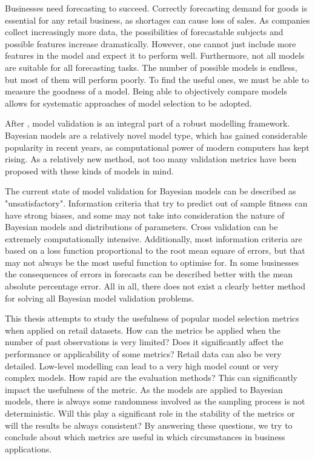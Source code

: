\documentclass[english, 12pt, a4paper, sci, utf8, a-1b, online]{aaltothesis}
\begin{document}




Businesses need forecasting to succeed. Correctly forecasting demand for goods is essential for any retail business, as shortages can cause loss of sales. As companies collect increasingly more data, the possibilities of forecastable subjects and possible features increase dramatically. However, one cannot just include more features in the model and expect it to perform well. Furthermore, not all models are suitable for all forecasting tasks. The number of possible models is endless, but most of them will perform poorly. To find the useful ones, we must be able to measure the goodness of a model. Being able to objectively compare models allows for systematic approaches of model selection to be adopted.

After \cite{BDA}, model validation is an integral part of a robust modelling framework. Bayesian models are a relatively novel model type, which has gained considerable popularity in recent years, as computational power of modern computers has kept rising. As a relatively new method, not too many validation metrics have been proposed with these kinds of models in mind.

The current state of model validation for Bayesian models can be described as "unsatisfactory". Information criteria that try to predict out of sample fitness can have strong biases, and some may not take into consideration the nature of Bayesian models and distributions of parameters. Cross validation can be extremely computationally intensive. Additionally, most information criteria are based on a loss function proportional to the root mean square of errors, but that may not always be the most useful function to optimise for. In some businesses the consequences of errors in forecasts can be described better with the mean absolute percentage error. All in all, there does not exist a clearly better method for solving all Bayesian model validation problems.

This thesis attempts to study the usefulness of popular model selection metrics when applied on retail datasets. How can the metrics be applied when the number of past observations is very limited? Does it significantly affect the performance or applicability of some metrics? Retail data can also be very detailed. Low-level modelling can lead to a very high model count or very complex models. How rapid are the evaluation methods? This can significantly impact the usefulness of the metric. As the models are applied to Bayesian models, there is always some randomness involved as the sampling process is not deterministic. Will this play a significant role in the stability of the metrics or will the results be always consistent? By answering these questions, we try to conclude about which metrics are useful in which circumstances in business applications.
\end{document}
